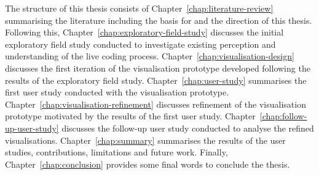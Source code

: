 The structure of this thesis consists of Chapter~\ref{chap:literature-review} summarising the literature including the basis for and the direction of this thesis. Following this, Chapter~\ref{chap:exploratory-field-study} discusses the initial exploratory field study conducted to investigate existing perception and understanding of the live coding process. Chapter~\ref{chap:visualisation-design} discusses the first iteration of the visualisation prototype developed following the results of the exploratory field study. Chapter~\ref{chap:user-study} summarises the first user study conducted with the visualisation prototype. Chapter~\ref{chap:visualisation-refinement} discusses refinement of the visualisation prototype motivated by the results of the first user study. Chapter~\ref{chap:follow-up-user-study} discusses the follow-up user study conducted to analyse the refined visualisations. Chapter~\ref{chap:summary} summarises the results of the user studies, contributions, limitations and future work. Finally, Chapter~\ref{chap:conclusion} provides some final words to conclude the thesis.


